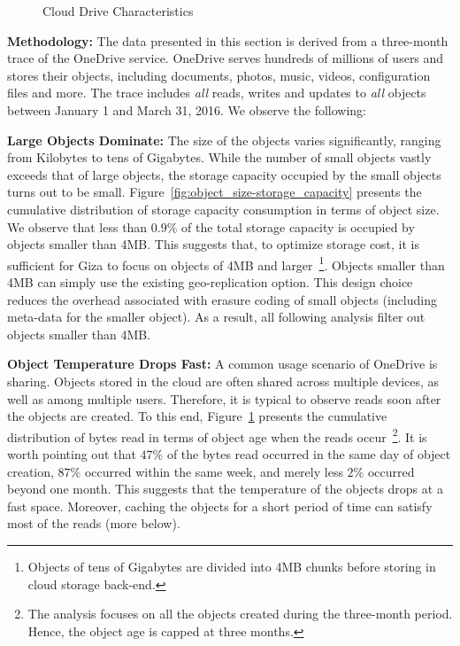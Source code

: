 \begin{figure}[tp]
\begin{subfigure}{.3\textwidth}
  \caption{}
  \label{fig:write_read_gap-bytes_read}
\end{subfigure}%
\caption{Cloud Drive Characteristics}
\label{fig:case_for_giza}
\end{figure}

{\bf Methodology:} The data presented in this section is derived from a three-month trace of the OneDrive service. OneDrive serves hundreds of millions of users and stores their objects, including documents, photos, music, videos, configuration files and more. The trace includes {\em all} reads, writes and updates to {\em all} objects between January 1 and March 31, 2016. We observe the following:

{\bf Large Objects Dominate:} The size of the objects varies significantly, ranging from Kilobytes to tens of Gigabytes. While the number of small objects vastly exceeds that of large objects, the storage capacity occupied by the small objects turns out to be small. Figure~\ref{fig:object_size-storage_capacity} presents the cumulative distribution of storage capacity consumption in terms of object size. We observe that less than $0.9\%$ of the total storage capacity is occupied by objects smaller than 4MB. This suggests that, to optimize storage cost, it is sufficient for Giza to focus on objects of 4MB and larger~\footnote{Objects of tens of Gigabytes are divided into 4MB chunks before storing in cloud storage back-end.}. Objects smaller than 4MB can simply use the existing geo-replication option. This design choice reduces the overhead associated with erasure coding of small objects (including meta-data for the smaller object). As a result, all following analysis filter out objects smaller than 4MB.

{\bf Object Temperature Drops Fast:} A common usage scenario of OneDrive is sharing. Objects stored in the cloud are often shared across multiple devices, as well as among multiple users. Therefore, it is typical to observe reads soon after the objects are created. To this end, Figure~\ref{fig:write_read_gap-bytes_read} presents the cumulative distribution of bytes read in terms of object age when the reads occur~\footnote{The analysis focuses on all the objects created during the three-month period. Hence, the object age is capped at three months.}. It is worth pointing out that $47\%$ of the bytes read occurred in the same day of object creation, $87\%$ occurred within the same week, and merely less $2\%$ occurred beyond one month. This suggests that the temperature of the objects drops at a fast space. Moreover, caching the objects for a short period of time can satisfy most of the reads (more below).

